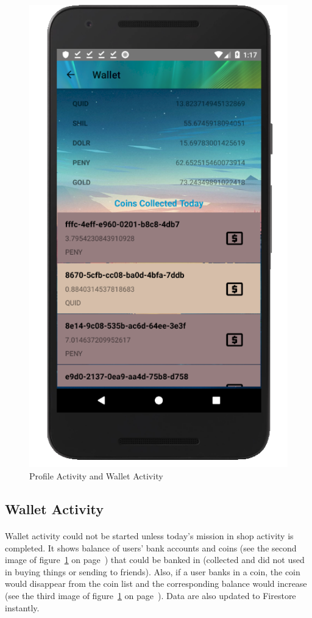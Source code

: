 \documentclass[12pt]{article}
\begin{document}
\begin{figure}
	\includegraphics[scale=0.25]{WalletCollect.png}
	\caption{\label{fig:profileWallet}Profile Activity and Wallet Activity}
\end{figure}

\subsection{Wallet Activity}
\paragraph{}
Wallet activity could not be started unless today's mission in shop activity is completed. It shows balance of users' bank accounts and coins (see the second image of figure~\ref{fig:profileWallet} on page~\pageref{fig:profileWallet}) that could be banked in (collected and did not used in buying things or sending to friends). Also, if a user banks in a coin, the coin would disappear from the coin list and the corresponding balance would increase (see the third image of figure~\ref{fig:profileWallet} on page~\pageref{fig:profileWallet}). Data are also updated to Firestore instantly.
\end{document}
